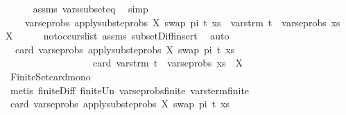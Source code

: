 \begin{isabellebody}
\ \ \ \ \isamarkupfalse%
\ assms\ vars{\isacharunderscore}{\kern0pt}subseteq\ \isamarkupfalse%
\ simp\isanewline
\ \ \isamarkupfalse%
\isanewline
\ \ \ \ {\isachardoublequoteopen}vars{\isacharunderscore}{\kern0pt}eprobs\ {\isacharparenleft}{\kern0pt}apply{\isacharunderscore}{\kern0pt}subst{\isacharunderscore}{\kern0pt}eprobs\ {\isacharbrackleft}{\kern0pt}{\isacharparenleft}{\kern0pt}X{\isacharcomma}{\kern0pt}\ swap\ pi\ t{\isacharparenright}{\kern0pt}{\isacharbrackright}{\kern0pt}\ xs{\isacharparenright}{\kern0pt}\ {\isasymsubseteq}\ vars{\isacharunderscore}{\kern0pt}trm\ t\ {\isasymunion}\ vars{\isacharunderscore}{\kern0pt}eprobs\ xs\ {\isacharminus}{\kern0pt}\ {\isacharbraceleft}{\kern0pt}X{\isacharbraceright}{\kern0pt}{\isachardoublequoteclose}\isanewline
\ \ \ \ \isamarkupfalse%
\ not{\isacharunderscore}{\kern0pt}occurs{\isacharunderscore}{\kern0pt}list\ assms\ subset{\isacharunderscore}{\kern0pt}Diff{\isacharunderscore}{\kern0pt}insert\ \isamarkupfalse%
\ auto\isanewline
\ \ \isamarkupfalse%
\ \isamarkupfalse%
\ \isanewline
\ \ {\isachardoublequoteopen}card\ {\isacharparenleft}{\kern0pt}vars{\isacharunderscore}{\kern0pt}eprobs\ {\isacharparenleft}{\kern0pt}apply{\isacharunderscore}{\kern0pt}subst{\isacharunderscore}{\kern0pt}eprobs\ {\isacharbrackleft}{\kern0pt}{\isacharparenleft}{\kern0pt}X{\isacharcomma}{\kern0pt}\ swap\ pi\ t{\isacharparenright}{\kern0pt}{\isacharbrackright}{\kern0pt}\ xs{\isacharparenright}{\kern0pt}{\isacharparenright}{\kern0pt}\isanewline
\ \ \ \ \ \ \ \ \ \ \ \ \ \ \ \ \ {\isasymle}\ card\ {\isacharparenleft}{\kern0pt}vars{\isacharunderscore}{\kern0pt}trm\ t\ {\isasymunion}\ vars{\isacharunderscore}{\kern0pt}eprobs\ xs\ {\isacharminus}{\kern0pt}\ {\isacharbraceleft}{\kern0pt}X{\isacharbraceright}{\kern0pt}{\isacharparenright}{\kern0pt}{\isachardoublequoteclose}\ \ \ \ \isanewline
\ \ \ \ \isamarkupfalse%
\ Finite{\isacharunderscore}{\kern0pt}Set{\isachardot}{\kern0pt}card{\isacharunderscore}{\kern0pt}mono\isanewline
\ \ \ \ \isamarkupfalse%
\ {\isacharparenleft}{\kern0pt}metis\ finite{\isacharunderscore}{\kern0pt}Diff\ finite{\isacharunderscore}{\kern0pt}Un\ vars{\isacharunderscore}{\kern0pt}eprobs{\isacharunderscore}{\kern0pt}finite\ vars{\isacharunderscore}{\kern0pt}term{\isacharunderscore}{\kern0pt}finite{\isacharparenright}{\kern0pt}\isanewline
\ \ \isamarkupfalse%
\ {\isachardoublequoteopen}card\ {\isacharparenleft}{\kern0pt}vars{\isacharunderscore}{\kern0pt}eprobs\ {\isacharparenleft}{\kern0pt}apply{\isacharunderscore}{\kern0pt}subst{\isacharunderscore}{\kern0pt}eprobs\ {\isacharbrackleft}{\kern0pt}{\isacharparenleft}{\kern0pt}X{\isacharcomma}{\kern0pt}\ swap\ pi\ t{\isacharparenright}{\kern0pt}{\isacharbrackright}{\kern0pt}\ xs{\isacharparenright}{\kern0pt}{\isacharparenright}{\kern0pt}\isanewline

\end{isabellebody}
